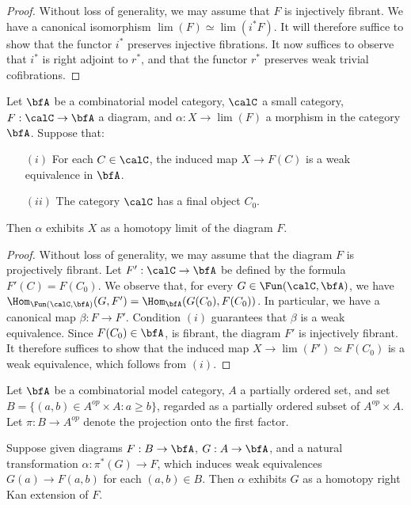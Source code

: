 \begin{proof}
Without loss of generality, we may assume that $F$ is injectively fibrant.
We have a canonical isomorphism $\lim(F) \simeq \lim( i^{\ast} F )$.
It will therefore suffice to show that the functor $i^{\ast}$ preserves injective fibrations.
It now suffices to observe that $i^{\ast}$ is right adjoint to $r^{\ast}$, and that
the functor $r^{\ast}$ preserves weak trivial cofibrations.
\end{proof}

\begin{lemma}\label{constancy}
Let $\bfA$ be a combinatorial model category, $\calC$ a small category, $F: \calC \rightarrow \bfA$ a diagram, and $\alpha: X \rightarrow \lim(F)$ a morphism in the category $\bfA$.
Suppose that:
\begin{itemize}
\item[$(i)$] For each $C \in \calC$, the induced map $X \rightarrow F(C)$ is a weak equivalence in $\bfA$.
\item[$(ii)$] The category $\calC$ has a final object $C_0$. 
\end{itemize}
Then $\alpha$ exhibits $X$ as a homotopy limit of the diagram $F$.
\end{lemma}

\begin{proof}
Without loss of generality, we may assume that the diagram $F$ is projectively fibrant.
Let $F': \calC \rightarrow \bfA$ be defined by the formula $F'(C) = F(C_0)$.
We observe that, for every $G \in \Fun(\calC, \bfA)$, we have
$\Hom_{ \Fun(\calC, \bfA) }( G, F') = \Hom_{\bfA}( G(C_0), F(C_0) )$. In particular,
we have a canonical map $\beta: F \rightarrow F'$. Condition $(i)$ guarantees that
$\beta$ is a weak equivalence. Since
$F(C_0) \in \bfA$, is fibrant, the diagram $F'$ is injectively fibrant. It therefore suffices to show that
the induced map $X \rightarrow \lim(F') \simeq F(C_0)$ is a weak equivalence, which follows from
$(i)$.
\end{proof}

\begin{lemma}\label{stride}
Let $\bfA$ be a combinatorial model category,
$A$ a partially ordered set, and set $B = \{ (a,b) \in A^{op} \times A: a \geq b \}$,
regarded as a partially ordered subset of $A^{op} \times A$. Let
$\pi: B \rightarrow A^{op}$ denote the projection onto the first factor.

Suppose given diagrams $F: B \rightarrow \bfA$, $G: A \rightarrow \bfA$,
and a natural transformation $\alpha: \pi^{\ast}(G) \rightarrow F$, which induces
weak equivalences $G(a) \rightarrow F(a,b)$ for each $(a,b) \in B$.
Then $\alpha$ exhibits $G$ as a homotopy right Kan extension of $F$.
\end{lemma}

